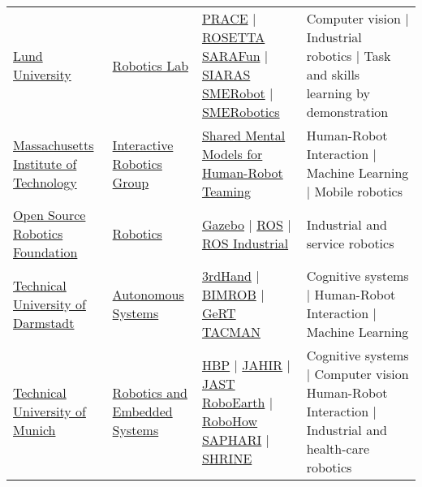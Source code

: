\begin{table}[H]
\begin{tabu} { X[m,c] X[0.9,m,c] X[1.2,m,c] X[1.8,m,c] }
		\tabucline[1pt on 1.5pt off 3pt]{-}
		\href{http://www.lunduniversity.lu.se/}{Lund University} &
		\href{http://www.control.lth.se/Research/Robotics.html}{Robotics Lab} &
		\href{http://www.control.lth.se/Research/Robotics/prace-project.html}{PRACE} | \href{http://www.fp7rosetta.org}{ROSETTA} \href{http://h2020sarafun.eu}{SARAFun} | \href{http://rss.cs.lth.se/projects/completed/siaras/}{SIARAS} \href{http://www.smerobot.org}{SMERobot} | \href{http://www.smerobotics.org/AUTOMATICA/exhibit-09-2016.html}{SMERobotics} &
		Computer vision | Industrial robotics | Task and skills learning by demonstration \\

		\tabucline[1pt on 1.5pt off 3pt]{-}
		\href{http://web.mit.edu/}{Massachusetts Institute of Technology} &
		\href{https://interactive.mit.edu/about/vision}{Interactive Robotics Group} &
		\href{https://interactive.mit.edu/research}{Shared Mental Models for Human-Robot Teaming} &
		Human-Robot Interaction | Machine Learning | Mobile robotics \\

		\tabucline[1pt on 1.5pt off 3pt]{-}
		\href{http://www.osrfoundation.org}{Open Source Robotics Foundation} &
		\href{http://www.osrfoundation.org/osrf-projects/}{Robotics} &
		\href{http://gazebosim.org/}{Gazebo} | \href{http://www.ros.org/}{ROS} | \href{http://rosindustrial.org/}{ROS Industrial} &
		Industrial and service robotics \\

		\tabucline[1pt on 1.5pt off 3pt]{-}
		\href{http://www.tu-darmstadt.de}{Technical University of Darmstadt} &
		\href{http://www.ausy.tu-darmstadt.de}{Autonomous Systems} &
		\href{http://3rdhandrobot.eu}{3rdHand} | \href{http://bimrob.ausy.tu-darmstadt.de/Main/HomePage}{BIMROB} | \href{http://www.gert-project.eu/project/project-summary}{GeRT} \href{http://tacman.eu}{TACMAN} &
		Cognitive systems | Human-Robot Interaction | Machine Learning \\

		\tabucline[1pt on 1.5pt off 3pt]{-}
		\href{http://www.tum.de/en}{Technical University of Munich} &
		\href{http://www6.in.tum.de/Main/Research}{Robotics and Embedded Systems} &
		\href{https://www.humanbrainproject.eu/}{HBP} | \href{http://www6.in.tum.de/Main/ResearchJahir}{JAHIR} | \href{http://www6.in.tum.de/Main/ResearchJast}{JAST} \href{http://roboearth.org/}{RoboEarth} | \href{https://robohow.eu}{RoboHow} \href{http://www.saphari.eu}{SAPHARI} | \href{http://www.shrine-project.eu}{SHRINE} &
		Cognitive systems | Computer vision Human-Robot Interaction | Industrial and health-care robotics \\


\end{tabu}
\end{table}
